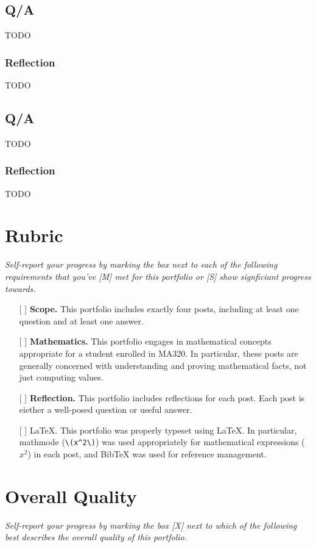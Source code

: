 \documentclass{article}
\begin{document}
\subsection{Q/A}
TODO \cite{1089984}

\subsubsection*{Reflection}
TODO

\subsection{Q/A}
TODO \cite{1089984}

\subsubsection*{Reflection}
TODO


\section{Rubric}
\textit{Self-report your progress by marking the box next to
each of the following requirements that you've [M] met
for this portfolio or [S] show signficiant progress towards.}

\begin{itemize}
\item[[ ]] \textbf{Scope.} This portfolio includes exactly
four posts, including at least one question and at least one
answer.
\item[[ ]] \textbf{Mathematics.} This portfolio engages in
mathematical concepts appropriate for a student enrolled in
MA320. In particular, these posts are generally concerned
with understanding and proving mathematical facts, not just
computing values.
\item[[ ]] \textbf{Reflection.} This portfolio includes
reflections for each post. Each post
is eiether a well-posed question or useful answer.
\item[[ ]] \LaTeX{}. This portfolio was properly typeset
using \LaTeX{}. In particular, mathmode (\verb|\(x^2\)|) was
used appropriately for mathematical expressions (\(x^2\))
in each post, and BibTeX was used for reference management.
\end{itemize}


\section{Overall Quality}
\textit{Self-report your progress by marking the box [X] next to
which of the following best describes the overall quality of
this portfolio.}
\end{document}
